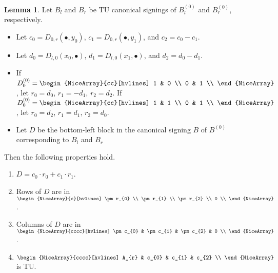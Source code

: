 \documentclass{article}
\theoremstyle{definition}
\newtheorem{lemma}[theorem]{Lemma}
\begin{document}
\begin{lemma}\label{lem:three_sum_canonical_signing_properties}
    Let $B_{l}$ and $B_{r}$ be TU canonical signings of $B_{l}^{(0)}$ and $B_{r}^{(0)}$, respectively.
    \begin{itemize}
        \item Let $c_{0} = D_{0, r} (\bullet, y_{0})$, $c_{1} = D_{0, r} (\bullet, y_{1})$, and $c_{2} = c_{0} - c_{1}$.
        \item Let $d_{0} = D_{l, 0} (x_{0}, \bullet)$, $d_{1} = D_{l, 0} (x_{1}, \bullet)$, and $d_{2} = d_{0} - d_{1}$.
        \item If $D_{0}^{(0)} = \begin{NiceArray}{cc}[hvlines] 1 & 0 \\ 0 & 1 \\ \end{NiceArray}$, let $r_{0} = d_{0}$, $r_{1} = -d_{1}$, $r_{2} = d_{2}$. If $D_{0}^{(0)} = \begin{NiceArray}{cc}[hvlines] 1 & 1 \\ 0 & 1 \\ \end{NiceArray}$, let $r_{0} = d_{2}$, $r_{1} = d_{1}$, $r_{2} = d_{0}$.
        \item Let $D$ be the bottom-left block in the canonical signing $B$ of $B^{(0)}$ corresponding to $B_{l}$ and $B_{r}$
    \end{itemize}
    Then the following properties hold.
    \begin{enumerate}
        \item\label{item:three_sum_canonical_signing_D_eq} $D = c_{0} \cdot r_{0} + c_{1} \cdot r_{1}$.
        \item\label{item:three_sum_canonical_signing_D_rows} Rows of $D$ are in $\begin{NiceArray}{c}[hvlines] \pm r_{0} \\ \pm r_{1} \\ \pm r_{2} \\ 0 \\ \end{NiceArray}$.
        \item\label{item:three_sum_canonical_signing_D_cols} Columns of $D$ are in $\begin{NiceArray}{cccc}[hvlines] \pm c_{0} & \pm c_{1} & \pm c_{2} & 0 \\ \end{NiceArray}$.
        \item\label{item:three_sum_canonical_signing_TU_A_r_cs} $\begin{NiceArray}{cccc}[hvlines] A_{r} & c_{0} & c_{1} & c_{2} \\ \end{NiceArray}$ is TU.

\end{enumerate}
\end{lemma}
\end{document}
